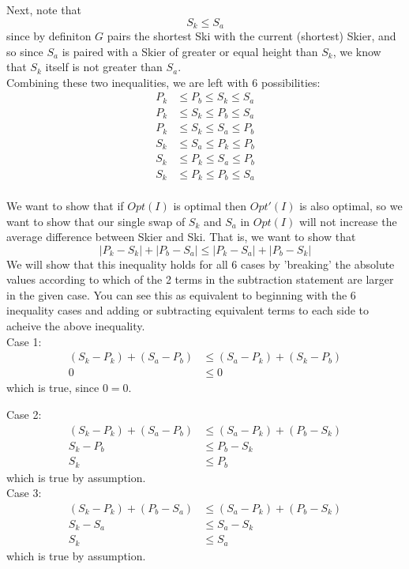 \documentclass[11pt]{article}
\begin{document}
Next, note that 
\[
S_k \le S_a
\]
since by definiton $G$ pairs the shortest Ski with the current (shortest) Skier, and so since $S_a$ is paired with a Skier of greater or equal height than $S_k$, we know that $S_k$ itself is not greater than $S_a$.\\
Combining these two inequalities, we are left with 6 possibilities:\\
\begin{align}
P_k &\le P_b \le S_k \le S_a\\
P_k &\le S_k \le P_b \le S_a\\
P_k &\le S_k \le S_a \le P_b\\
S_k &\le S_a \le P_k \le P_b\\
S_k &\le P_k \le S_a \le P_b\\
S_k &\le P_k \le P_b \le S_a
\end{align}\\
We want to show that if $Opt(I)$ is optimal then $Opt'(I)$ is also optimal, so we want to show that our single swap of $S_k$ and $S_a$ in $Opt(I)$ will not increase the average difference between Skier and Ski. That is, we want to show that
\[
|P_k - S_k| + |P_b - S_a| \le |P_k - S_a| + |P_b - S_k|
\]
We will show that this inequality holds for all 6 cases by 'breaking' the absolute values according to which of the 2 terms in the subtraction statement are larger in the given case. You can see this as equivalent to beginning with the 6 inequality cases and adding or subtracting equivalent terms to each side to acheive the above inequality.\\
Case 1:
\begin{align*}
(S_k - P_k) + (S_a - P_b) &\le (S_a - P_k) + (S_k - P_b)\\
0 &\le 0
\end{align*}
which is true, since $0 = 0$.

Case 2:
\begin{align*}
(S_k - P_k) + (S_a - P_b) &\le (S_a - P_k) + (P_b - S_k)\\
S_k - P_b &\le P_b - S_k\\
S_k &\le P_b
\end{align*}
which is true by assumption.\\

Case 3:
\begin{align*}
(S_k - P_k) + (P_b - S_a) &\le (S_a - P_k) + (P_b - S_k)\\
S_k - S_a &\le S_a - S_k\\
S_k &\le S_a
\end{align*}
which is true by assumption.\\
\end{document}

